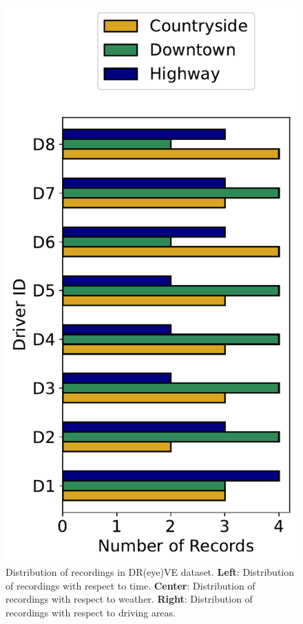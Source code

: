 \begin{figure}[h]
\begin{minipage}{0.33\textwidth}
        \centering
        \includegraphics[width=\textwidth]{images/dreyeve/area_distrib.pdf}
    \end{minipage}\hfill
    \caption[Distribution of recordings with respect to time, weather and areas.]
    {Distribution of recordings in DR(eye)VE dataset. 
    \textbf{Left}: Distribution of recordings with respect to time.
    \textbf{Center}: Distribution of recordings with respect to weather.
    \textbf{Right}: Distribution of recordings with respect to driving areas.}
    \label{fig:dreyeve_rec_distrib}
\end{figure}

